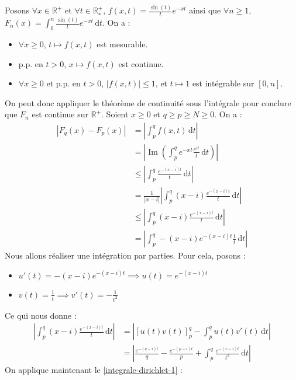 	\begin{demonstration}
		Posons $\forall x \in \mathbb{R}^+$ et $\forall t \in \mathbb{R}^+_*$, $f(x,t) = \frac{\sin(t)}{t} e^{-xt}$ ainsi que $\forall n \geq 1$, $F_n(x) = \int_0^n \frac{\sin(t)}{t} e^{-xt} \, \mathrm{d}t$. On a :
		\begin{itemize}
			\item $\forall x \geq 0$, $t \mapsto f(x, t)$ est mesurable.
			\item p.p. en $t > 0$, $x \mapsto f(x, t)$ est continue.
			\item $\forall x \geq 0$ et p.p. en $t > 0$, $|f(x,t)| \leq 1$, et $t \mapsto 1$ est intégrable sur $[0,n]$.
		\end{itemize}
		On peut donc appliquer le théorème de continuité sous l'intégrale pour conclure que $F_n$ est continue sur $\mathbb{R}^+$.
		\newpar
		Soient $x \geq 0$ et $q \geq p \geq N \geq 0$. On a :
		\begin{align*}
			|F_q(x) - F_p(x)| &= \left| \int_p^q f(x,t) \, \mathrm{d}t \right| \\
			&= \left| \operatorname{Im} \left( \int_p^q e^{-xt} \frac{e^{it}}{t} \, \mathrm{d}t \right) \right| \\
			&\leq \left| \int_p^q \frac{e^{-(x-i)t}}{t} \, \mathrm{d}t \right| \\
			&= \frac{1}{|x-i|} \left| \int_p^q (x-i) \frac{e^{-(x-i)t}}{t} \, \mathrm{d}t \right| \\
			&\leq \left| \int_p^q (x-i) \frac{e^{-(x-i)t}}{t} \, \mathrm{d}t \right| \\
			&= \left| \int_p^q -(x-i) e^{-(x-i)t} \frac{1}{t} \, \mathrm{d}t \right|
		\end{align*}
		Nous allons réaliser une intégration par parties. Pour cela, posons :
		\begin{itemize}
			\item $u'(t) = -(x-i) e^{-(x-i)t} \implies u(t) = e^{-(x-i)t}$
			\item $v(t) = \frac{1}{t} \implies v'(t) = -\frac{1}{t^2}$
		\end{itemize}
		Ce qui nous donne :
		\begin{align*}
			\left| \int_p^q (x-i) \frac{e^{-(x-i)t}}{t} \, \mathrm{d}t \right| &= \left| \left[ u(t)v(t) \right]_p^q - \int_p^q u(t) v'(t) \, \mathrm{d}t \right| \\
			&= \left| \frac{e^{-(q-i)t}}{q} - \frac{e^{-(p-i)t}}{p} +  \int_p^q \frac{e^{-(x-i)t}}{t^2} \, \mathrm{d}t \right|
		\end{align*}
		On applique maintenant le \cref{integrale-dirichlet-1} :

\end{demonstration}
